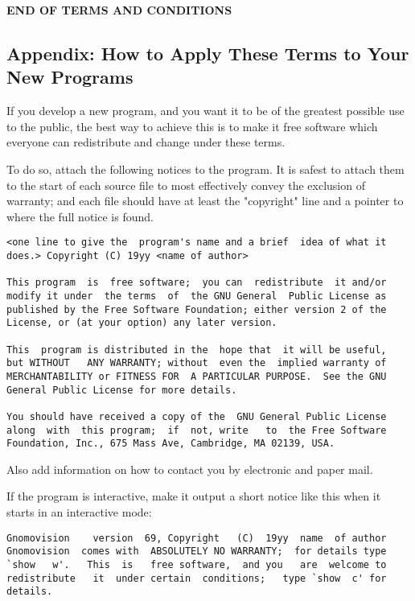 \textbf{END OF TERMS AND CONDITIONS}

\subsection{Appendix: How to Apply These Terms to Your New Programs}

If you develop a new program, and you want it to be of the greatest
possible use to the public, the best way to achieve this is to make it
free software which everyone can redistribute and change under these
terms.

To do so, attach the following notices to the program.  It is safest
to attach them to the start of each source file to most effectively
convey the exclusion of warranty; and each file should have at least
the "copyright" line and a pointer to where the full notice is found.

\begin{verbatim}
<one line to give the  program's name and a brief  idea of what it
does.> Copyright (C) 19yy <name of author>

This program  is  free software;  you can  redistribute  it and/or
modify it under  the terms  of  the GNU General  Public License as
published by the Free Software Foundation; either version 2 of the
License, or (at your option) any later version.

This  program is distributed in the  hope that  it will be useful,
but WITHOUT   ANY WARRANTY; without  even the  implied warranty of
MERCHANTABILITY or FITNESS FOR  A PARTICULAR PURPOSE.  See the GNU
General Public License for more details.

You should have received a copy of the  GNU General Public License
along  with  this program;  if  not, write   to  the Free Software
Foundation, Inc., 675 Mass Ave, Cambridge, MA 02139, USA.
\end{verbatim}

Also add information on  how to contact you   by electronic and  paper
mail.

If the program is interactive, make it output a short notice like this
when it starts in an interactive mode:

\begin{verbatim}
Gnomovision    version  69, Copyright   (C)  19yy  name  of author
Gnomovision  comes with  ABSOLUTELY NO WARRANTY;  for details type
`show   w'.   This  is   free software,  and you   are  welcome to
redistribute   it  under certain  conditions;   type `show  c' for
details.
\end{verbatim}

